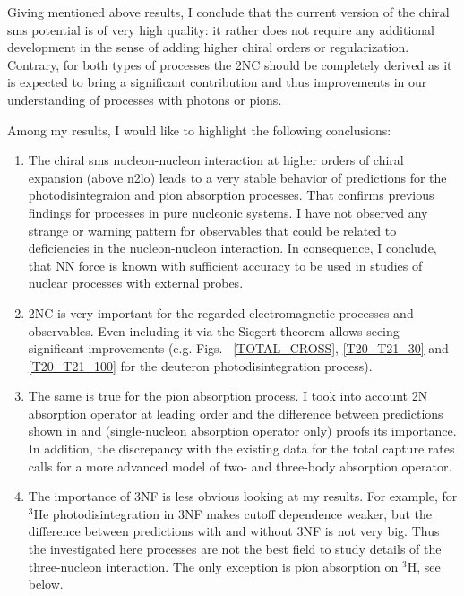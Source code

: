 Giving mentioned above results, I conclude that the current version of 
the chiral \gls{sms} potential is of very high quality:
it rather does not require any additional development in the sense of adding higher chiral orders or regularization.
Contrary, for both types of processes the 2NC should be completely derived as it is expected to bring 
a significant contribution and thus improvements in our understanding of processes
with photons or pions.

Among my results, I would like to highlight the following 
conclusions:

\begin{enumerate}
    \item The chiral \gls{sms} nucleon-nucleon interaction at higher orders of chiral expansion (above \gls{n2lo})
    leads to a very stable behavior of predictions for the photodisintegraion and pion absorption processes.
    That confirms previous findings for processes in pure nucleonic systems.
    I have not observed any strange or warning pattern for observables that could be related to
    deficiencies in the nucleon-nucleon interaction.
    In consequence, I conclude, that NN force is known with sufficient accuracy to be used in studies of 
    nuclear processes with external probes.
    \item 2NC is very important for the regarded electromagnetic processes and observables. Even including it via the Siegert theorem allows seeing significant improvements (e.g. Figs.~ \ref{TOTAL_CROSS}, \ref{T20_T21_30} and \ref{T20_T21_100} for the deuteron photodisintegration process).
    \item The same is true for the pion absorption process. I took into account 2N absorption operator at leading order and the difference between
    predictions shown in  and 
    (single-nucleon absorption operator only) proofs its importance.
    In addition, the discrepancy with the existing data for the total capture rates calls for a more advanced model of two-
    and three-body absorption operator.
    \item The importance of 3NF is less obvious looking at my results.
    For example, for $^3$He photodisintegration in  3NF makes cutoff dependence weaker,
    but the difference between predictions with and without 3NF is not very big.
    Thus the investigated here processes are not the best field to study details
    of the three-nucleon interaction.
    The only exception is pion absorption on $^3$H, see below.

\end{enumerate}
